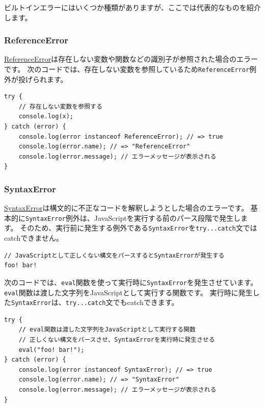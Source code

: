 ビルトインエラーにはいくつか種類がありますが、ここでは代表的なものを紹介します。

\hypertarget{reference-error}{%
\subsubsection{ReferenceError}\label{reference-error}}

\href{https://developer.mozilla.org/ja/docs/Web/JavaScript/Reference/Global_Objects/ReferenceError}{ReferenceError}は存在しない変数や関数などの識別子が参照された場合のエラーです。
次のコードでは、存在しない変数を参照しているため\texttt{ReferenceError}例外が投げられます。

\begin{lstlisting}
try {
    // 存在しない変数を参照する
    console.log(x);
} catch (error) {
    console.log(error instanceof ReferenceError); // => true
    console.log(error.name); // => "ReferenceError"
    console.log(error.message); // エラーメッセージが表示される
}
\end{lstlisting}

\hypertarget{syntax-error}{%
\subsubsection{SyntaxError}\label{syntax-error}}

\href{https://developer.mozilla.org/ja/docs/Web/JavaScript/Reference/Global_Objects/SyntaxError}{SyntaxError}は構文的に不正なコードを解釈しようとした場合のエラーです。
基本的に\texttt{SyntaxError}例外は、JavaScriptを実行する前のパース段階で発生します。
そのため、実行前に発生する例外である\texttt{SyntaxError}を\texttt{try...catch}文ではcatchできません。

\begin{lstlisting}
// JavaScriptとして正しくない構文をパースするとSyntaxErrorが発生する
foo! bar!
\end{lstlisting}

次のコードでは、\texttt{eval}関数を使って実行時に\texttt{SyntaxError}を発生させています。
\texttt{eval}関数は渡した文字列をJavaScriptとして実行する関数です。
実行時に発生した\texttt{SyntaxError}は、\texttt{try...catch}文でもcatchできます。

\begin{lstlisting}
try {
    // eval関数は渡した文字列をJavaScriptとして実行する関数
    // 正しくない構文をパースさせ、SyntaxErrorを実行時に発生させる
    eval("foo! bar!");
} catch (error) {
    console.log(error instanceof SyntaxError); // => true
    console.log(error.name); // => "SyntaxError"
    console.log(error.message); // エラーメッセージが表示される
}
\end{lstlisting}

